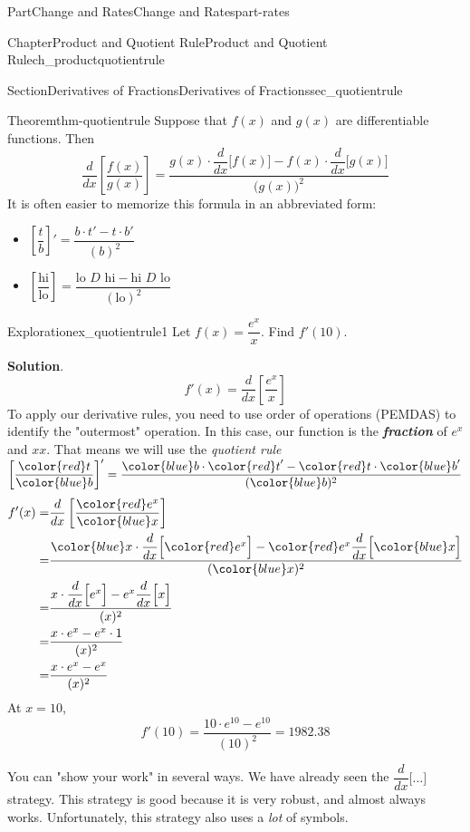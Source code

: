 \documentclass[oneside,10pt,]{tufte-book}
\newcommand{\blocktitlefont}{\relax}
\newcommand{\alert}[1]{\textbf{\textit{#1}}}
\numberwithin{equation}{chapter}
\newcommand{\red}[1]{   {\color{red}   #1}   }
\newcommand{\blue}[1]{  {\color{blue}  #1}  }
\newcommand{\ddx}[1]{ \dfrac{d}{dx} \Big[ #1 \Big]  }
\newcommand{\ddxfrac}[1]{ \dfrac{d}{dx} \left[ #1 \right]  }
\newcommand{\amp}{&}
\begin{document}
\begin{partptx}{Part}{Change and Rates}{}{Change and Rates}{}{}{part-rates}
\begin{chapterptx}{Chapter}{Product and Quotient Rule}{}{Product and Quotient Rule}{}{}{ch_productquotientrule}
\begin{sectionptx}{Section}{Derivatives of Fractions}{}{Derivatives of Fractions}{}{}{sec_quotientrule}
\begin{theorem}{Theorem}{}{}{thm-quotientrule}%
Suppose that \(f(x)\) and \(g(x)\) are differentiable functions.  Then%
\begin{equation*}
\ddxfrac{\dfrac{f(x)}{g(x)}} = \dfrac{g(x) \cdot \ddx{f(x)} - f(x) \cdot \ddx{g(x)} }{\Big(g(x)\Big)^2}
\end{equation*}
It is often easier to memorize this formula in an abbreviated form:%
\begin{itemize}[label=\textbullet]
\item{}\(\displaystyle \left[\dfrac{t}{b}\right]' = \dfrac{b\cdot t' - t\cdot b'}{(b)^2} \)%
\item{}\(\displaystyle \left[\dfrac{\text{hi}}{\text{lo}} \right] = \dfrac{\text{lo }D\text{ hi} - \text{hi }D\text{ lo} }{(\text{lo})^2}\)%
\end{itemize}
%
\end{theorem}
\begin{exploration}{Exploration}{}{ex_quotientrule1}%
Let \(f(x) = \dfrac{e^x}{x}\). Find \(f'(10)\).%
\par\smallskip%
\noindent\textbf{\blocktitlefont Solution}.\hypertarget{ex_quotientrule1-2}{}\quad{}%
\begin{equation*}
f'(x) = \ddxfrac{  \dfrac{e^x}{x}  }
\end{equation*}
To apply our derivative rules, you need to use order of operations (PEMDAS) to identify the "outermost" operation. In this case, our function is the \alert{fraction} of \(e^x\) and  \(xx\).  That means we will use the \emph{quotient rule} \(\left[\dfrac{\red{t}}{\blue{b}}\right]' = \dfrac{\blue{b}\cdot \red{t}' - \red{t}\cdot \blue{b}'}{(\blue{b})^2}\)%
\begin{align*}
f'(x) = \amp \ddxfrac{  \dfrac{\red{e^x}}{\blue{x}}  }\\
= \amp \dfrac{\blue{x}\cdot \ddx{\red{e^x}} - \red{e^x} \ddx{\blue{x}}}{(\blue{x})^2}\\
= \amp \dfrac{ x\cdot \ddx{ e^x } - e^x \ddx{ x }}{(x)^2}\\
= \amp \dfrac{ x\cdot e^x - e^x \cdot 1}{(x)^2}\\
= \amp \dfrac{ x\cdot e^x - e^x }{(x)^2}
\end{align*}
At \(x=10\),%
\begin{equation*}
f'(10) = \dfrac{ 10\cdot e^{10} - e^{10} }{(10)^2} = 1982.38
\end{equation*}
%
\end{exploration}%
You can "show your work" in several ways. We have already seen the \(\ddx{\dots}\) strategy. This strategy is good because it is very robust, and almost always works. Unfortunately, this strategy also uses a \emph{lot} of symbols.%

\end{sectionptx}
\end{chapterptx}
\end{partptx}
\end{document}
